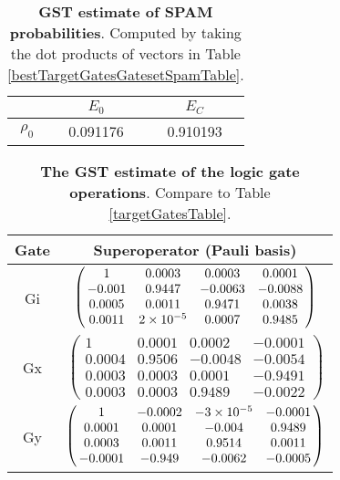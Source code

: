 {\begin{table}[h]
\begin{center}
\begin{tabular}[l]{|c|c|c|}
\hline
 & $E_{0}$ & $E_C$ \\ \hline
$\rho_{0}$ & 0.091176 & 0.910193 \\ \hline
\end{tabular}

\caption{\textbf{GST estimate of SPAM probabilities}.  Computed by taking the dot products of vectors in Table \ref{bestTargetGatesGatesetSpamTable}.\label{bestTargetGatesGatesetSpamParametersTable}}
\end{center}
\end{table}

\begin{table}[h]
\begin{center}
\begin{tabular}[l]{|c|c|}
\hline
Gate & Superoperator (Pauli basis) \\ \hline
Gi & $ \left(\!\!\begin{array}{cccc}
1 & 0.0003 & 0.0003 & 0.0001 \\ 
-0.001 & 0.9447 & -0.0063 & -0.0088 \\ 
0.0005 & 0.0011 & 0.9471 & 0.0038 \\ 
0.0011 & 2\times 10^{-5} & 0.0007 & 0.9485
 \end{array}\!\!\right) $
 \\ \hline
Gx & $ \left(\!\!\begin{array}{cccc}
1 & 0.0001 & 0.0002 & -0.0001 \\ 
0.0004 & 0.9506 & -0.0048 & -0.0054 \\ 
0.0003 & 0.0003 & 0.0001 & -0.9491 \\ 
0.0003 & 0.0003 & 0.9489 & -0.0022
 \end{array}\!\!\right) $
 \\ \hline
Gy & $ \left(\!\!\begin{array}{cccc}
1 & -0.0002 & -3\times 10^{-5} & -0.0001 \\ 
0.0001 & 0.0001 & -0.004 & 0.9489 \\ 
0.0003 & 0.0011 & 0.9514 & 0.0011 \\ 
-0.0001 & -0.949 & -0.0062 & -0.0005
 \end{array}\!\!\right) $
 \\ \hline
\end{tabular}

\caption{\textbf{The GST estimate of the logic gate operations}.  Compare to Table \ref{targetGatesTable}.\label{bestTargetGatesGatesetGatesTable}}
\end{center}
\end{table}

}
